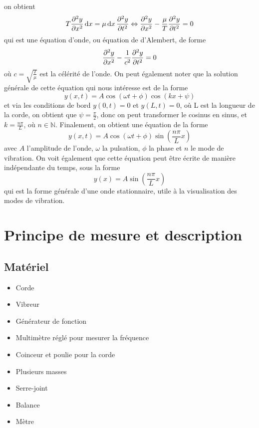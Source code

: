 \documentclass[11pt]{article}
\begin{document}
    on obtient
    \[
        T \pdv[2]{y}{x} \dd{x} = \mu \dd{x} \pdv[2]{y}{t} \Leftrightarrow \pdv[2]{y}{x} - \frac{\mu}{T} \pdv[2]{y}{t} = 0
    \]
    qui est une équation d'onde, ou équation de d'Alembert, de forme
    \[
        \pdv[2]{y}{x} - \frac{1}{c^2} \pdv[2]{y}{t} = 0
    \]
    où $c = \sqrt{\frac{T}{\mu}}$ est la célérité de l'onde.
    On peut également noter que la solution générale de cette équation qui nous intéresse est de la forme
    \[
        y(x,t) = A \cos \left( \omega t + \phi \right) \cos \left( kx + \psi \right)
    \]
    et via les conditions de bord $y(0,t)=0$ et $y(L,t)=0$, où L est la longueur de la corde, on obtient que
    $\psi = \frac{\pi}{2}$, donc on peut transformer le cosinus en sinus, et $k = \frac{n \pi}{L}$, où
    $n \in \mathbb{N}$.
    Finalement, on obtient une équation de la forme
    \[
        y(x,t) = A \cos \left( \omega t + \phi \right) \sin \left( \frac{n \pi}{L} x \right)
    \]
    avec $A$ l'amplitude de l'onde, $\omega$ la pulsation, $\phi$ la phase et $n$ le mode de vibration.
    On voit également que cette équation peut être écrite de manière indépendante du temps, sous la forme
    \[
        y(x) = A \sin \left( \frac{n \pi}{L} x \right)
    \]
    qui est la forme générale d'une onde stationnaire, utile à la visualisation des modes de vibration.

    \section{Principe de mesure et description}\label{sec:principe-de-mesure-et-description}

    \subsection{Matériel}\label{subsec:materiel}

    \begin{itemize}
        \item Corde
        \item Vibreur
        \item Générateur de fonction
        \item Multimètre réglé pour mesurer la fréquence
        \item Coinceur et poulie pour la corde
        \item Plusieurs masses
        \item Serre-joint
        \item Balance
        \item Mètre
    \end{itemize}
\end{document}
